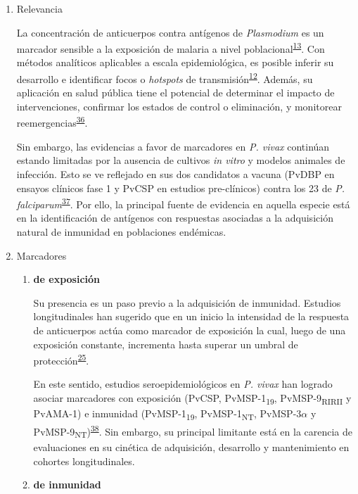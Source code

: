 \documentclass[]{article}
\begin{document}
\begin{enumerate}
\def\labelenumi{\alph{enumi}.}
\item
  Relevancia

  La concentración de anticuerpos contra antígenos de \emph{Plasmodium}
  es un marcador sensible a la exposición de malaria a nivel
  poblacional\textsuperscript{\protect\hyperlink{ref-elliott2014}{13}}.
  Con métodos analíticos aplicables a escala epidemiológica, es posible
  inferir su desarrollo e identificar focos o \emph{hotspots} de
  transmisión\textsuperscript{\protect\hyperlink{ref-hotspots2015}{12}}.
  Además, su aplicación en salud pública tiene el potencial de
  determinar el impacto de intervenciones, confirmar los estados de
  control o eliminación, y monitorear
  reemergencias\textsuperscript{\protect\hyperlink{ref-sepulveda2015}{36}}.

  Sin embargo, las evidencias a favor de marcadores en \emph{P. vivax}
  continúan estando limitadas por la ausencia de cultivos \emph{in
  vitro} y modelos animales de infección. Esto se ve reflejado en sus
  dos candidatos a vacuna (PvDBP en ensayos clínicos fase 1 y PvCSP en
  estudios pre-clínicos) contra los 23 de \emph{P.
  falciparum}\textsuperscript{\protect\hyperlink{ref-rainbow2016}{37}}.
  Por ello, la principal fuente de evidencia en aquella especie está en
  la identificación de antígenos con respuestas asociadas a la
  adquisición natural de inmunidad en poblaciones endémicas.
\item
  Marcadores

  \begin{enumerate}
  \def\labelenumii{\roman{enumii}.}
  \item
    \textbf{de exposición}

    Su presencia es un paso previo a la adquisición de inmunidad.
    Estudios longitudinales han sugerido que en un inicio la intensidad
    de la respuesta de anticuerpos actúa como marcador de exposición la
    cual, luego de una exposición constante, incrementa hasta superar un
    umbral de
    protección\textsuperscript{\protect\hyperlink{ref-Stanisic2015}{25}}.

    En este sentido, estudios seroepidemiológicos en \emph{P. vivax} han
    logrado asociar marcadores con exposición (PvCSP,
    PvMSP-1\textsubscript{19}, PvMSP-9\textsubscript{RIRII} y PvAMA-1) e
    inmunidad (PvMSP-1\textsubscript{19}, PvMSP-1\textsubscript{NT},
    PvMSP-3\(\alpha\) y
    PvMSP-9\textsubscript{NT})\textsuperscript{\protect\hyperlink{ref-cutts2014meta}{38}}.
    Sin embargo, su principal limitante está en la carencia de
    evaluaciones en su cinética de adquisición, desarrollo y
    mantenimiento en cohortes longitudinales. 
  \item
    \textbf{de inmunidad}


\end{enumerate}
\end{enumerate}
\end{document}
